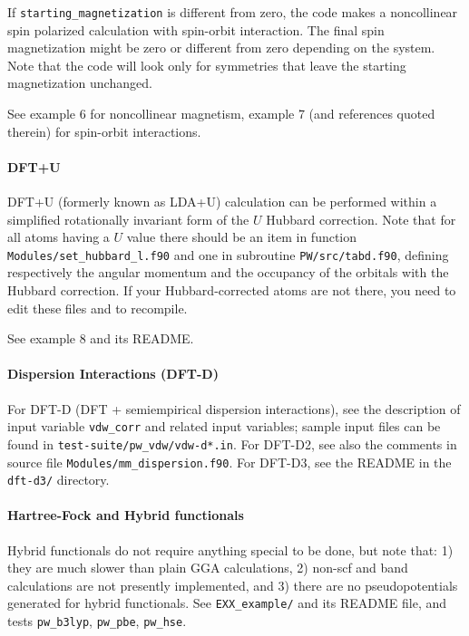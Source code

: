 \documentclass[12pt,a4paper]{article}
\begin{document}
If \texttt{starting\_magnetization} is different from zero, the code makes a 
noncollinear spin polarized calculation with spin-orbit interaction. The 
final spin magnetization might be zero or different from zero depending 
on the system. Note that the code will look only for symmetries that leave
the starting magnetization unchanged.

See example 6 for noncollinear magnetism, example 7 (and references
quoted therein) for spin-orbit interactions.

\paragraph{DFT+U}
DFT+U (formerly known as LDA+U) calculation can be
performed within a simplified rotationally invariant form 
of the $U$ Hubbard correction. Note that for all atoms having 
a $U$ value there should be an item in function
\texttt{Modules/set\_hubbard\_l.f90} and one in 
subroutine \texttt{PW/src/tabd.f90}, defining respectively
the angular momentum and the occupancy of the orbitals with
the Hubbard correction. If your Hubbard-corrected atoms are not
there, you need to edit these files and to recompile.

See example 8 and its README.

\paragraph{Dispersion Interactions (DFT-D)}
For DFT-D (DFT + semiempirical dispersion interactions), see the
description of input variable \texttt{vdw\_corr} and related
input variables; sample input files can be found in
\texttt{test-suite/pw\_vdw/vdw-d*.in}. For DFT-D2, see also the
comments in source file \texttt{Modules/mm\_dispersion.f90}.
For DFT-D3, see the README in the \texttt{dft-d3/} directory.

\paragraph{Hartree-Fock and Hybrid functionals}

Hybrid functionals do not require anything special to be done,
but note that: 1) they are much slower than plain GGA calculations,
2) non-scf and band calculations are not presently implemented, and
3) there are no pseudopotentials generated for hybrid functionals.
See \texttt{EXX\_example/} and its README file, and tests
\texttt{pw\_b3lyp}, \texttt{pw\_pbe}, \texttt{pw\_hse}.
\end{document}
